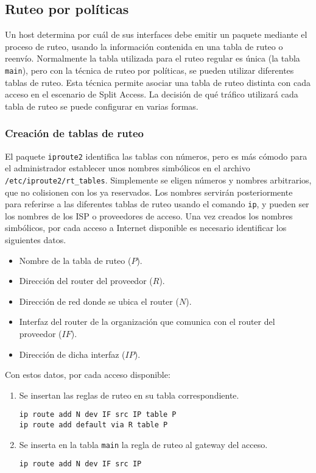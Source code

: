  

\subsection{Ruteo por políticas}
Un host determina por cuál de sus interfaces debe emitir un paquete mediante el proceso de ruteo, usando la información contenida en una tabla de ruteo o reenvío. Normalmente la tabla utilizada para el ruteo regular es única (la tabla \texttt{main}), pero con la técnica de ruteo por políticas, se pueden utilizar diferentes tablas de ruteo. Esta técnica permite asociar una tabla de ruteo distinta con cada acceso en el escenario de Split Access. La decisión de qué tráfico utilizará cada tabla de ruteo se puede configurar en varias formas. 

\subsubsection{Creación de tablas de ruteo}
El paquete \texttt{iproute2} identifica las tablas con números, pero es más cómodo para el administrador establecer unos nombres simbólicos en el archivo \texttt{/etc/iproute2/rt\_tables}. Simplemente se eligen números y nombres arbitrarios, que no colisionen con los ya reservados. Los nombres servirán posteriormente para referirse a las diferentes tablas de ruteo usando el comando \texttt{ip}, y pueden ser los nombres de los ISP o proveedores de acceso. Una vez creados los nombres simbólicos, por cada acceso a Internet disponible es necesario identificar los siguientes datos.
\begin{itemize}
	\item Nombre de la tabla de ruteo ($P$).
	\item Dirección del router del proveedor ($R$).
	\item Dirección de red donde se ubica el router ($N$).
	\item Interfaz del router de la organización que comunica con el router del proveedor ($IF$).
	\item Dirección de dicha interfaz ($IP$).
\end{itemize}

Con estos datos, por cada acceso disponible:
\begin{enumerate}
	\item Se insertan las reglas de ruteo en su tabla correspondiente. 
\begin{lstlisting}
ip route add N dev IF src IP table P
ip route add default via R table P
\end{lstlisting}
	\item Se inserta en la tabla \texttt{main} la regla de ruteo al gateway del acceso.
	\begin{lstlisting}
ip route add N dev IF src IP
\end{lstlisting}
\end{enumerate} 

